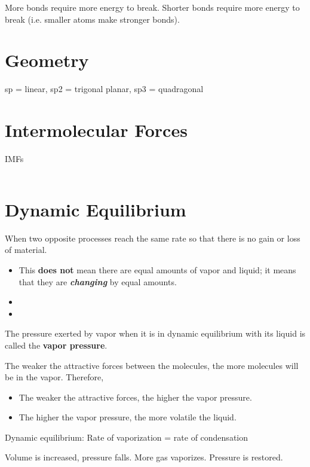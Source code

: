 \documentclass{article}
\theoremstyle{mytheoremstyle}
\theoremstyle{mytheoremstyle}
\theoremstyle{myproblemstyle}
\begin{document}
More bonds require more energy to break. Shorter bonds require more energy to break (i.e. smaller atoms make stronger bonds).

\section{Geometry}

sp = linear, sp2 = trigonal planar, sp3 = quadragonal

\section{Intermolecular Forces}

IMFs

\begin{tabular}{p{1in}p{1in}p{1in}p{1in}}


\end{tabular}

\section{Dynamic Equilibrium}

When two opposite processes reach the same rate so that there is no gain or loss of material.
\begin{itemize}
    \item This \textbf{does not} mean there are equal amounts of vapor and liquid; it means that they are \textit{\textbf{changing}} by equal amounts.
    \item
    \item
\end{itemize}

The pressure exerted by vapor when it is in dynamic equilibrium with its liquid is called the \textbf{vapor pressure}.

The weaker the attractive forces between the molecules, the more molecules will be in the vapor. Therefore,

\begin{itemize}
    \item The weaker the attractive forces, the higher the vapor pressure.
    \item The higher the vapor pressure, the more volatile the liquid.
\end{itemize}

Dynamic equilibrium: Rate of vaporization = rate of condensation

Volume is increased, pressure falls. More gas vaporizes. Pressure is restored.
\end{document}
